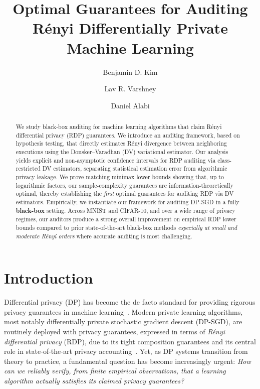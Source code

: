 \documentclass{article}
\title{Optimal Guarantees for Auditing R\'enyi Differentially Private Machine Learning}
\author[1]{Benjamin D. Kim}
\author[2]{Lav R. Varshney}
\author[3]{Daniel Alabi}
\affil[1,2,3]{University of Illinois Urbana-Champaign}
\affil[1]{Massachusetts Institute of Technology}
\affil[2]{Stony Brook University}
\theoremstyle{plain}
\theoremstyle{definition}
\theoremstyle{remark}
\begin{document}
\maketitle


\begin{abstract}

We study black-box auditing for machine learning algorithms that claim R\'enyi differential privacy (RDP) guarantees. We introduce an auditing framework, based on hypothesis testing, that directly estimates R\'enyi divergence between neighboring executions using the Donsker–Varadhan (DV) variational estimator. Our analysis yields explicit and non-asymptotic confidence intervals for RDP auditing via class-restricted DV estimators, separating statistical estimation error from algorithmic privacy leakage.  We prove matching minimax lower bounds showing that, up to logarithmic factors, our sample-complexity guarantees are information-theoretically optimal, thereby establishing the \textit{first} optimal guarantees for auditing RDP via DV estimators.
Empirically, we instantiate our framework for auditing DP-SGD in a fully \textbf{black-box} setting. Across MNIST and CIFAR-10, and over a wide range of privacy regimes, our auditors produce a strong overall improvement on empirical RDP lower bounds compared to prior state-of-the-art black-box methods \textit{especially at small and moderate R\'enyi orders} where accurate auditing is most challenging.

\end{abstract}


\section{Introduction}
\label{sec:intro}




Differential privacy (DP) has become the de facto standard for providing rigorous privacy
guarantees in machine learning~\citep{DworkMNS06,DworkKMMN06}.
Modern private learning algorithms, most notably differentially private stochastic gradient descent (DP-SGD), 
are routinely deployed with privacy guarantees, expressed in terms of \emph{R\'enyi differential privacy}
(RDP), due to its tight composition guarantees and its central role in state-of-the-art privacy
accounting~\citep{abadi2016deep,mironov2017renyi}. Yet, as DP systems transition from theory to practice,
a fundamental question has become increasingly urgent:
\emph{How can we reliably verify, from finite empirical observations, that a learning algorithm actually
satisfies its claimed privacy guarantees?}
\end{document}

